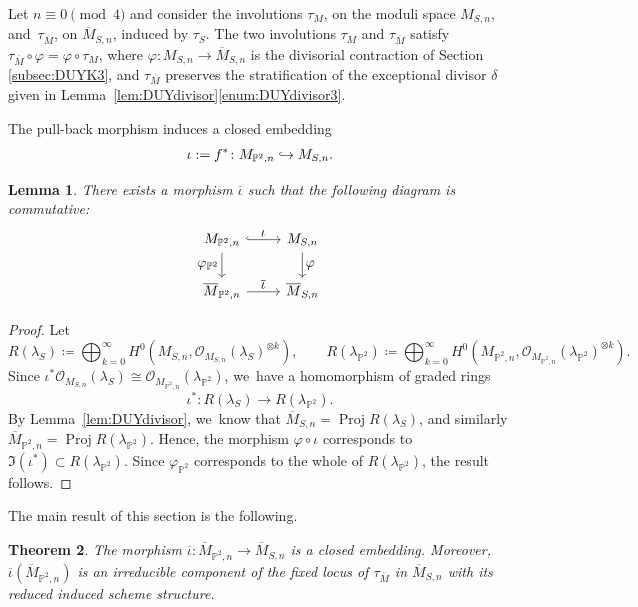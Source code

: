 \documentclass[JEP,XML,SOM,Unicode,published]{cedram}
\let\ts\textstyle
\newcommand\hto{\mathrel{\lhook\joinrel\to}}
\newcommand{\PP}{{\mathbb P}}\let\P\PP
\newcommand\cO{\mathcal{O}}
\DeclareMathOperator{\Proj}{Proj}
\let\phi\varphi
\newtheorem{lemm}{Lemma}[section]
\newtheorem{theo}[lemm]{Theorem}
\theoremstyle{definition}
\begin{document}
Let $n\equiv 0 \pmod 4$ and consider the involutions $\tau_M$, on the moduli space $M_{S,n}$, and~$\tau_{\overline{M}}$, on $\overline{M}_{S,n}$, induced by
$\tau_S$.
The two involutions $\tau_M$ and $\tau_{\overline{M}}$ satisfy $\tau_{\overline{M}}\circ\phi=\phi\circ\tau_M$, where $\phi\colon M_{S,n}\to \overline{M}_{S,n}$ is the divisorial contraction of Section \ref{subsec:DUYK3}, and $\tau_M$ preserves the stratification of the exceptional divisor $\delta$ given in Lemma~\ref{lem:DUYdivisor}\ref{enum:DUYdivisor3}.

The pull-back morphism induces a closed embedding
\[
\iota:= f^*\colon M_{\PP^2,n} \hto M_{S,n}.
\]

\begin{lemm}
There exists a morphism $\overline{\iota}$ such that the following diagram is commutative:
\[
\begin{tikzcd}
M_{\PP^2, n}\arrow[hookrightarrow, r,"\ts\iota"] \arrow[d,"\ts\varphi_{\PP^2}"'] & M_{S, n} \arrow[d, "\ts\varphi"]\\
\overline{M}_{\PP^2, n}\arrow[r,"\ts\overline{\iota}"]& \overline{M}_{S, n}
\end{tikzcd}
\]
\end{lemm}

\begin{proof}
Let
\begin{equation*}
R(\lambda_S)\coloneqq \bigoplus_{k=0}^{\infty} H^0(M_{S,n},\cO_{M_{S,n}}(\lambda_S)^{\otimes k}),\qquad
R(\lambda_{\PP^2})\coloneqq \bigoplus_{k=0}^{\infty} H^0(M_{\PP^2,n},\cO_{M_{\PP^2,n}}(\lambda_{\PP^2})^{\otimes k}).
\end{equation*}
Since $\iota^{*}\cO_{M_{S,n}}(\lambda_S)\cong \cO_{M_{\PP^2,n}}(\lambda_{\PP^2})$, we~have a homomorphism of graded rings
\[
\iota^*\colon R(\lambda_S) \to R(\lambda_{\PP^2}).
\]
By Lemma~\ref{lem:DUYdivisor}, we~know that $\overline{M}_{S, n}=\Proj R(\lambda_S)$, and similarly $\overline{M}_{\PP^2, n}=\Proj R(\lambda_{\PP^2})$.
Hence, the morphism $\phi\circ\iota$ corresponds to $\Im(\iota^*)\subset R(\lambda_{\PP^2})$. Since $\phi_{\PP^2}$ corresponds to the whole of $R(\lambda_{\PP^2})$, the result follows.
\end{proof}

The main result of this section is the following.

\begin{theo}\label{thm:embedding}
The morphism $\overline{\iota}\colon \overline{M}_{\PP^2,n}\to \overline{M}_{S,n}$ is a closed embedding.
Moreover, $\overline{\iota}(\overline{M}_{\PP^2,n})$ is an irreducible component of the fixed locus of $\tau_{\overline{M}}$ in $\overline{M}_{S,n}$ with its reduced induced scheme structure.
\end{theo}
\end{document}
